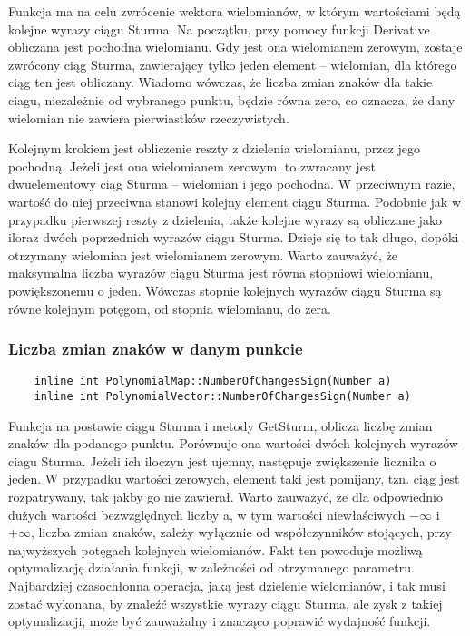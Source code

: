 \documentclass[oneside,a4paper]{book}
\begin{document}
	Funkcja ma na celu zwrócenie wektora wielomianów, w którym wartościami będą kolejne wyrazy ciągu Sturma. Na początku, przy pomocy funkcji Derivative obliczana jest pochodna wielomianu. Gdy jest ona wielomianem zerowym, zostaje zwrócony ciąg Sturma, zawierający tylko jeden element – wielomian, dla którego ciąg ten jest obliczany. Wiadomo wówczas, że liczba zmian znaków dla takie ciagu, niezależnie od wybranego punktu, będzie równa zero, co oznacza, że dany wielomian nie zawiera pierwiastków rzeczywistych.
	
	Kolejnym krokiem jest obliczenie reszty z dzielenia wielomianu, przez jego pochodną. Jeżeli jest ona wielomianem zerowym, to zwracany jest dwuelementowy ciąg Sturma – wielomian i jego pochodna. W przeciwnym razie, wartość do niej przeciwna stanowi kolejny element ciągu Sturma. Podobnie jak w przypadku pierwszej reszty z dzielenia, także kolejne wyrazy są obliczane jako iloraz dwóch poprzednich wyrazów ciągu Sturma. Dzieje się to tak długo, dopóki otrzymany wielomian jest wielomianem zerowym. Warto zauważyć, że maksymalna liczba wyrazów ciągu Sturma jest równa stopniowi wielomianu, powiększonemu o jeden. Wówczas stopnie kolejnych wyrazów ciągu Sturma są równe kolejnym potęgom, od stopnia wielomianu, do zera.
	
	\subsubsection{Liczba zmian znaków w danym punkcie}
	\begin{lstlisting}
	inline int PolynomialMap::NumberOfChangesSign(Number a)
	inline int PolynomialVector::NumberOfChangesSign(Number a)
	\end{lstlisting}
	
	Funkcja na postawie ciągu Sturma i metody GetSturm, oblicza liczbę zmian znaków dla podanego punktu. Porównuje ona wartości dwóch kolejnych wyrazów ciagu Sturma. Jeżeli ich iloczyn jest ujemny, następuje zwiększenie licznika o jeden. W przypadku wartości zerowych, element taki jest pomijany, tzn. ciąg jest rozpatrywany, tak jakby go nie zawierał. Warto zauważyć, że dla odpowiednio dużych wartości bezwzględnych liczby a, w tym wartości niewłaściwych $-\infty$ i $+\infty$, liczba zmian znaków, zależy wyłącznie od współczynników stojących, przy najwyższych potęgach kolejnych wielomianów. Fakt ten powoduje możliwą optymalizację działania funkcji, w zależności od otrzymanego parametru. Najbardziej czasochłonna operacja, jaką jest dzielenie wielomianów, i tak musi zostać wykonana, by znaleźć wszystkie wyrazy ciągu Sturma, ale zysk z takiej optymalizacji, może być zauważalny i znacząco poprawić wydajność funkcji.
	
\end{document}
